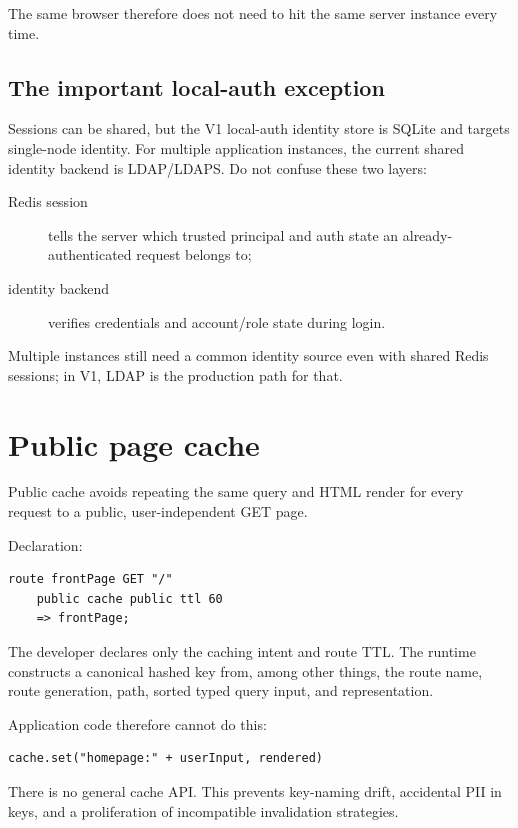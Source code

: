 The same browser therefore does not need to hit the same server instance every time.

\subsection*{The important local-auth exception}

Sessions can be shared, but the V1 local-auth identity store is SQLite and targets single-node identity. For multiple application instances, the current shared identity backend is LDAP/LDAPS. Do not confuse these two layers:

\begin{description}
  \item[Redis session] tells the server which trusted principal and auth state an already-authenticated request belongs to;
  \item[identity backend] verifies credentials and account/role state during login.
\end{description}

Multiple instances still need a common identity source even with shared Redis sessions; in V1, LDAP is the production path for that.

\section{Public page cache}

Public cache avoids repeating the same query and HTML render for every request to a public, user-independent GET page.

Declaration:

\begin{lstlisting}[language=Velran]
route frontPage GET "/"
    public cache public ttl 60
    => frontPage;
\end{lstlisting}

The developer declares only the caching intent and route TTL. The runtime constructs a canonical hashed key from, among other things, the route name, route generation, path, sorted typed query input, and representation.

Application code therefore cannot do this:

\begin{lstlisting}
cache.set("homepage:" + userInput, rendered)
\end{lstlisting}

There is no general cache API. This prevents key-naming drift, accidental PII in keys, and a proliferation of incompatible invalidation strategies.

